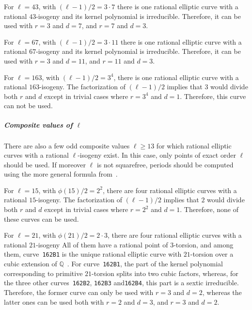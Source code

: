 \documentclass[12pt]{article}
\theoremstyle{plain}
\theoremstyle{definition}
\def\Q{\ensuremath{\mathbb{Q}}}
\begin{document}
For $\ell = 43$, with $(\ell-1)/2 = 3\cdot7$
there is one rational elliptic curve
with a rational $43$-isogeny 
and its kernel polynomial is irreducible.
Therefore, it can be used with $r = 3$ and $d = 7$,
and $r = 7$ and $d = 3$.

For $\ell = 67$, with $(\ell-1)/2 = 3\cdot11$
there is one rational elliptic curve
with a rational $67$-isogeny 
and its kernel polynomial is irreducible.
Therefore, it can be used with $r = 3$ and $d = 11$,
and $r = 11$ and $d = 3$.

For $\ell = 163$, with $(\ell-1)/2 = 3^4$,
there is one rational elliptic curve
with a rational $163$-isogeny.
The factorization of $(\ell-1)/2$ implies
that $3$ would divide both $r$ and $d$
except in trivial cases where $r = 3^4$ and $d = 1$.
Therefore, this curve can not be used.

\subparagraph{Composite values of $\ell$}
There are also a few odd composite values $\ell \geq 13$
for which rational elliptic curves with a rational $\ell$-isogeny exist.
In this case, only points of exact order $\ell$ should be used.
If moreover $\ell$ is not squarefree, periods should be computed
using the more general formula from~\cite{feisel1999normal}.


For $\ell = 15$, with $\phi(15)/2 = 2^2$,
there are four rational elliptic curves with a rational $15$-isogeny.
The factorization of $(\ell-1)/2$ implies
that $2$ would divide both $r$ and $d$
except in trivial cases where $r = 2^2$ and $d = 1$.
Therefore, none of these curves can be used.


For $\ell = 21$, with $\phi(21)/2 = 2\cdot3$,
there are four rational elliptic curves with a rational $21$-isogeny
All of them have a rational point of $3$-torsion,
and among them, curve~\texttt{162B1} is the unique rational elliptic curve
with $21$-torsion over a cubic extension of $\Q$~\cite{najman_cubic}.
For curve~\texttt{162B1},
the part of the kernel polynomial corresponding to primitive $21$-torsion
splits into two cubic factors, whereas,
for the three other curves~\texttt{162B2}, \texttt{162B3} and\texttt{162B4},
this part is a sextic irreducible.
Therefore, the former curve can only be used with $r = 3$ and $d = 2$,
whereas the latter ones can be used both with $r = 2$ and $d = 3$,
and $r = 3$ and $d = 2$.
\end{document}
